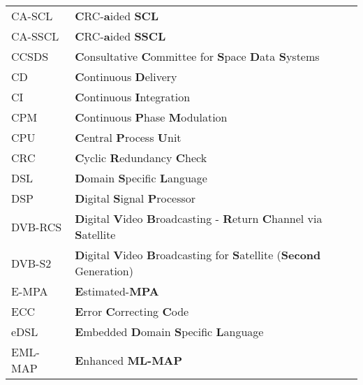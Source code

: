 \begin{center}
\begin{longtable}{ p{}  p{} }
CA-SCL      & \textbf{C}RC-\textbf{a}ided \textbf{SCL}                                                                        \\
CA-SSCL     & \textbf{C}RC-\textbf{a}ided \textbf{SSCL}                                                                       \\
CCSDS       & \textbf{C}onsultative \textbf{C}ommittee for \textbf{S}pace \textbf{D}ata \textbf{S}ystems                      \\
CD          & \textbf{C}ontinuous \textbf{D}elivery                                                                           \\
CI          & \textbf{C}ontinuous \textbf{I}ntegration                                                                        \\
CPM         & \textbf{C}ontinuous \textbf{P}hase \textbf{M}odulation                                                          \\
CPU         & \textbf{C}entral \textbf{P}rocess \textbf{U}nit                                                                 \\
CRC         & \textbf{C}yclic \textbf{R}edundancy \textbf{C}heck                                                              \\
DSL         & \textbf{D}omain \textbf{S}pecific \textbf{L}anguage                                                             \\
DSP         & \textbf{D}igital \textbf{S}ignal \textbf{P}rocessor                                                             \\
DVB-RCS     & \textbf{D}igital \textbf{V}ideo \textbf{B}roadcasting - \textbf{R}eturn \textbf{C}hannel via \textbf{S}atellite \\
DVB-S2      & \textbf{D}igital \textbf{V}ideo \textbf{B}roadcasting for \textbf{S}atellite (\textbf{Second} Generation)       \\
E-MPA       & \textbf{E}stimated-\textbf{MPA}                                                                                 \\
ECC         & \textbf{E}rror \textbf{C}orrecting \textbf{C}ode                                                                \\
eDSL        & \textbf{E}mbedded \textbf{D}omain \textbf{S}pecific \textbf{L}anguage                                           \\
EML-MAP     & \textbf{E}nhanced \textbf{ML-MAP}                                                                               \\

\end{longtable}
\end{center}
